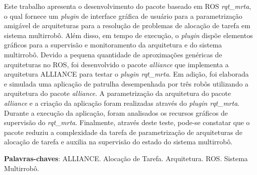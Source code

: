 \newpage
\begin{resumo}
    Este trabalho apresenta o desenvolvimento do pacote baseado em ROS \textit{rqt\_mrta}, o qual fornece um \textit{plugin} de interface gráfica de usuário para a parametrização amigável de arquiteturas para a resolução de problemas de alocação de tarefa em sistema multirrobô. Além disso, em tempo de execução, o \textit{plugin} dispõe elementos gráficos para a supervisão e monitoramento da arquitetura e do sistema multirrobô. Devido a pequena quantidade de aproximações genéricas de arquiteturas no ROS, foi desenvolvido o pacote \textit{alliance} que implementa a arquitetura ALLIANCE para testar o \textit{plugin rqt\_mrta}. Em adição, foi elaborada e simulada uma aplicação de patrulha desempenhada por três robôs utilizando a arquitetura do pacote \textit{alliance}. A parametrização da arquitetura do pacote \textit{alliance} e a criação da aplicação foram realizadas através do \textit{plugin rqt\_mrta}. Durante a execução da aplicação, foram analisados os recursos gráficos de supervisão do \textit{rqt\_mrta}. Finalmente, através deste teste, pode-se constatar que o pacote reduziu a complexidade da tarefa de parametrização de arquiteturas de alocação de tarefa e auxilia na supervisão do estado do sistema multirrobô.
    
    \vspace{\onelineskip}
    
    \noindent
    \textbf{Palavras-chaves}: ALLIANCE. Alocação de Tarefa. Arquitetura. ROS. Sistema Multirrobô. 
\end{resumo}
\newpage
